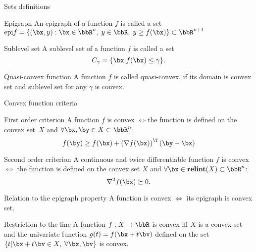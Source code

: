 \documentclass[12pt]{beamer}
\begin{document}
\begin{frame}{Sets definitions}
\begin{block}{Epigraph}
An epigraph of a function $f$ is called a set $\text{epi}f = \{ (\bx, y) : \bx \in \bbR^n, \; y \in \bbR, \; y \geq f(\bx) \} \subset \bbR^{n+1}$
\end{block}

\begin{block}{Sublevel set}
A sublevel set of a function $f$ is called a set
\vspace{-4mm}
\[
C_{\gamma} = \{ \bx | f(\bx) \leq \gamma \}.
\]
\end{block}

\begin{block}{Quasi-convex function}
A function $f$ is called quasi-convex, if its domain is convex set and sublevel set for any $\gamma$ is convex. 
\end{block}
\end{frame}

\begin{frame}{Convex function criteria}
\footnotesize
\vspace{-2mm}
\begin{block}{First order criterion}
A function $f$ is convex $\Leftrightarrow$the function is defined on the convex set~$X$ and $\forall \bx, \by \in X \subset \bbR^n$:
\vspace{-4mm}
\[
f(\by) \geq f(\bx) + \left( \nabla f(\bx) \right)^{\T} (\by - \bx)
\]
\end{block}

\begin{block}{Second order criterion}
A continuous and twice differentiable function $f$ is convex $\Leftrightarrow$ the function is defined on the convex set $X$ and $\forall \bx \in \textbf{relint}(X) \subset \bbR^n$:
\vspace{-2mm}
\[
\nabla^2 f(\bx) \succeq 0.
\]
\end{block}

\begin{block}{Relation to the epigraph property}
A function is convex $\Leftrightarrow$ its epigraph is convex set.
\end{block}

\begin{block}{Restriction to the line}
A function $f: X \rightarrow \bbR$ is convex iff $X$ is a convex set and the univariate function $g(t) = f(\bx + t\bv)$ defined on the set $\{ t | \bx + t\bv \in X, \; \forall \bx, \bv \}$ is convex.
\end{block}

\end{frame}
\end{document}

